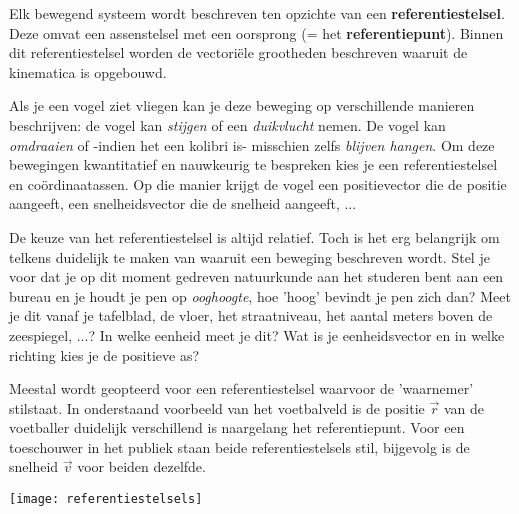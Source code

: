 \documentclass{ximera}
\begin{document}
	\author{Bart Lambregs}
    \xmsource\xmuitleg


Elk bewegend systeem wordt beschreven ten opzichte van een \textbf{referentiestelsel}. Deze omvat een assenstelsel met een oorsprong (= het \textbf{referentiepunt}).
Binnen dit referentiestelsel worden de vectoriële grootheden beschreven waaruit de kinematica is opgebouwd. 
 
Als je een vogel ziet vliegen kan je deze beweging op verschillende manieren beschrijven: de vogel kan \textit{stijgen} of een \textit{duikvlucht} nemen. De vogel kan \textit{omdraaien} of -indien het een kolibri is- misschien zelfs \textit{blijven hangen}. Om deze bewegingen kwantitatief en nauwkeurig te bespreken kies je een referentiestelsel en coördinaatassen. Op die manier krijgt de vogel een positievector die de positie aangeeft, een snelheidsvector die de snelheid aangeeft, ... 

De keuze van het referentiestelsel is altijd relatief. Toch is het erg belangrijk om telkens duidelijk te maken van waaruit een beweging beschreven wordt.
Stel je voor dat je op dit moment gedreven natuurkunde aan het studeren bent aan een bureau en je houdt je pen op \textit{ooghoogte}, hoe 'hoog' bevindt je pen zich dan? Meet je dit vanaf je tafelblad, de vloer, het straatniveau, het aantal meters boven de zeespiegel, ...? In welke eenheid meet je dit? Wat is je eenheidsvector en in welke richting kies je de positieve as? 

Meestal wordt geopteerd voor een referentiestelsel waarvoor de 'waarnemer' stilstaat. %
In onderstaand voorbeeld van het voetbalveld is de positie \(\vec{r}\) van de voetballer duidelijk verschillend is naargelang het referentiepunt.
Voor een toeschouwer in het publiek staan beide referentiestelsels stil, bijgevolg is de snelheid \(\vec{v}\) voor beiden dezelfde.


\begin{center}
\begin{minipage}[t]{0.70\textwidth}
\begin{image}[\linewidth]
	\texttt{[image: referentiestelsels]}
\end{image}
\end{minipage}
\end{center}
\end{document}
